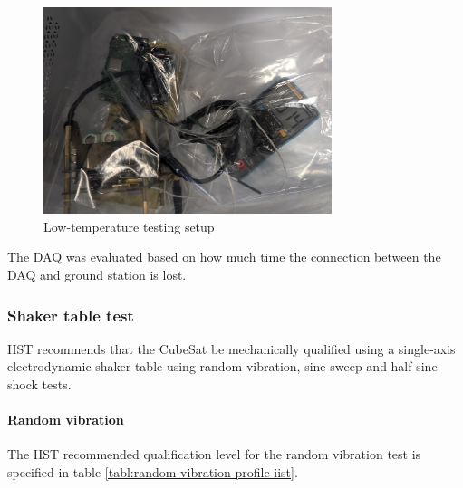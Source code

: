 \documentclass[a4paper,11pt]{article}
\begin{document}
\begin{figure}[H]
  \centering
  \includegraphics[width=0.75\textwidth]{images/fridge_test.jpg}
  \caption{Low-temperature testing setup}
  \label{fig:temperature-testing-fridge}
\end{figure}

The DAQ was evaluated based on how much time the connection between the DAQ and ground station is lost.

\subsubsection{Shaker table test}  \label{sec:shaker-table-test}

IIST recommends that the CubeSat be mechanically qualified using a single-axis electrodynamic shaker table using random vibration, sine-sweep and half-sine shock tests.

\paragraph{Random vibration}

The IIST recommended qualification level for the random vibration test is specified in table \ref{tabl:random-vibration-profile-iist}.
\end{document}
